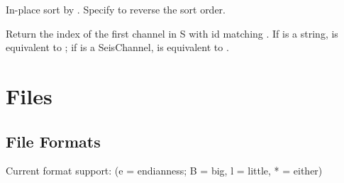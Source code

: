 \documentclass[letterpaper,11pt,english]{sphinxmanual}
\begin{document}
In-place sort by . Specify  to reverse the sort order.


\begin{fulllineitems}
\end{fulllineitems}


Return the index of the first channel in S with id matching . If  is a string,  is equivalent to ; if  is a SeisChannel,  is equivalent to .


\chapter{Files}
\label{\detokenize{index:files}}

\section{File Formats}
\label{\detokenize{src/Formats/fileformats:file-formats}}\label{\detokenize{src/Formats/fileformats::doc}}
Current format support: (e = endianness; B = big, l = little, * = either)
\end{document}
